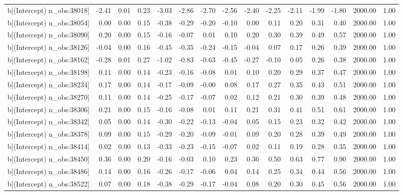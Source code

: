 \begin{table}[ht]
\begin{tabular}{rrrrrrrrrrrrrrr}
  b[(Intercept) n\_obs:38018] & -2.41 & 0.01 & 0.23 & -3.03 & -2.86 & -2.70 & -2.56 & -2.40 & -2.25 & -2.11 & -1.99 & -1.80 & 2000.00 & 1.00 \\ 
  b[(Intercept) n\_obs:38054] & 0.00 & 0.00 & 0.15 & -0.38 & -0.29 & -0.20 & -0.10 & 0.00 & 0.11 & 0.20 & 0.31 & 0.40 & 2000.00 & 1.00 \\ 
  b[(Intercept) n\_obs:38090] & 0.20 & 0.00 & 0.15 & -0.16 & -0.07 & 0.01 & 0.10 & 0.20 & 0.30 & 0.39 & 0.49 & 0.57 & 2000.00 & 1.00 \\ 
  b[(Intercept) n\_obs:38126] & -0.04 & 0.00 & 0.16 & -0.45 & -0.35 & -0.24 & -0.15 & -0.04 & 0.07 & 0.17 & 0.26 & 0.39 & 2000.00 & 1.00 \\ 
  b[(Intercept) n\_obs:38162] & -0.28 & 0.01 & 0.27 & -1.02 & -0.83 & -0.63 & -0.45 & -0.27 & -0.10 & 0.05 & 0.26 & 0.38 & 2000.00 & 1.00 \\ 
  b[(Intercept) n\_obs:38198] & 0.11 & 0.00 & 0.14 & -0.23 & -0.16 & -0.08 & 0.01 & 0.10 & 0.20 & 0.29 & 0.37 & 0.47 & 2000.00 & 1.00 \\ 
  b[(Intercept) n\_obs:38234] & 0.17 & 0.00 & 0.14 & -0.17 & -0.09 & -0.00 & 0.08 & 0.17 & 0.27 & 0.35 & 0.43 & 0.51 & 2000.00 & 1.00 \\ 
  b[(Intercept) n\_obs:38270] & 0.11 & 0.00 & 0.14 & -0.25 & -0.17 & -0.07 & 0.02 & 0.12 & 0.21 & 0.30 & 0.39 & 0.48 & 2000.00 & 1.00 \\ 
  b[(Intercept) n\_obs:38306] & 0.21 & 0.00 & 0.15 & -0.16 & -0.08 & 0.01 & 0.11 & 0.21 & 0.31 & 0.41 & 0.51 & 0.61 & 2000.00 & 1.00 \\ 
  b[(Intercept) n\_obs:38342] & 0.05 & 0.00 & 0.14 & -0.30 & -0.22 & -0.13 & -0.04 & 0.05 & 0.15 & 0.23 & 0.32 & 0.42 & 2000.00 & 1.00 \\ 
  b[(Intercept) n\_obs:38378] & 0.09 & 0.00 & 0.15 & -0.29 & -0.20 & -0.09 & -0.01 & 0.09 & 0.20 & 0.28 & 0.39 & 0.49 & 2000.00 & 1.00 \\ 
  b[(Intercept) n\_obs:38414] & 0.02 & 0.00 & 0.13 & -0.33 & -0.23 & -0.15 & -0.07 & 0.02 & 0.11 & 0.19 & 0.28 & 0.35 & 2000.00 & 1.00 \\ 
  b[(Intercept) n\_obs:38450] & 0.36 & 0.00 & 0.20 & -0.16 & -0.03 & 0.10 & 0.23 & 0.36 & 0.50 & 0.63 & 0.77 & 0.90 & 2000.00 & 1.00 \\ 
  b[(Intercept) n\_obs:38486] & 0.14 & 0.00 & 0.16 & -0.26 & -0.17 & -0.06 & 0.04 & 0.14 & 0.25 & 0.34 & 0.44 & 0.56 & 2000.00 & 1.00 \\ 
  b[(Intercept) n\_obs:38522] & 0.07 & 0.00 & 0.18 & -0.38 & -0.29 & -0.17 & -0.04 & 0.08 & 0.20 & 0.30 & 0.45 & 0.56 & 2000.00 & 1.00 \\ 

\end{tabular}
\end{table}
